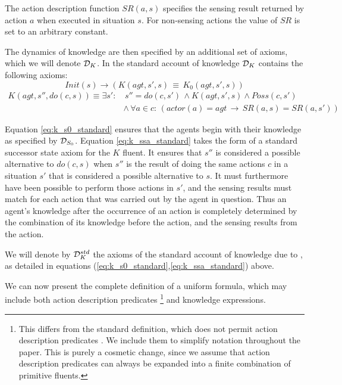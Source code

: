 The action description function $SR(a,s)$ specifies the sensing result
returned by action $a$ when executed in situation $s$. For non-sensing
actions the value of $SR$ is set to an arbitrary constant.

The dynamics of knowledge are then specified by an additional set
of axioms, which we will denote $\mathcal{D}_{K}$. In the standard account
of knowledge $\mathcal{D}_{K}$ contains the following axioms:\begin{equation}
Init(s)\rightarrow\left(K(agt,s',s)\,\equiv\, K_{0}(agt,s',s)\right)\label{eq:k_s0_standard}\end{equation}
 \begin{align}
K(agt,s'',do(c,s))\equiv\exists s': & \, s''=do(c,s')\,\wedge K(agt,s',s)\wedge Poss(c,s')\nonumber \\
 & \wedge\,\forall a\in c:\,\left(actor(a)=agt\,\rightarrow\, SR(a,s)=SR(a,s')\right)\label{eq:k_ssa_standard}\end{align}


Equation \eqref{eq:k_s0_standard} ensures that the agents begin with
their knowledge as specified by $\mathcal{D}_{S_{0}}$. Equation \eqref{eq:k_ssa_standard}
takes the form of a standard successor state axiom for the $K$ fluent.
It ensures that $s''$ is considered a possible alternative to $do(c,s)$
when $s''$ is the result of doing the same actions $c$ in a situation
$s'$ that is considered a possible alternative to $s$. It must furthermore
have been possible to perform those actions in $s'$, and the sensing
results must match for each action that was carried out by the agent
in question. Thus an agent's knowledge after the occurrence of an
action is completely determined by the combination of its knowledge
before the action, and the sensing results from the action.

\medskip{}


\begin{defn}
We will denote by $\mathcal{D}_{K}^{std}$ the axioms of the standard account
of knowledge due to \citet{scherl03sc_knowledge}, as detailed in
equations (\ref{eq:k_s0_standard},\ref{eq:k_ssa_standard}) above. 
\end{defn}
We can now present the complete definition of a uniform formula, which
may include both action description predicates%
\footnote{This differs from the standard definition, which does not permit action
description predicates \citet{pirri99contributions_sitcalc}. We include
them to simplify notation throughout the paper. This is purely a cosmetic
change, since we assume that action description predicates can always
be expanded into a finite combination of primitive fluents.%
} and knowledge expressions.

